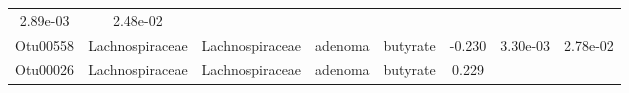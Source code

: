 \documentclass[11pt,]{article}
\begin{document}
\begin{longtable}[]{@{}cccccccc@{}}
\begin{minipage}[t]{0.08\columnwidth}
2.89e-03\strut
\end{minipage} & \begin{minipage}[t]{0.08\columnwidth}\centering\strut
2.48e-02\strut
\end{minipage}\tabularnewline
\begin{minipage}[t]{0.08\columnwidth}\centering\strut
Otu00558\strut
\end{minipage} & \begin{minipage}[t]{0.15\columnwidth}\centering\strut
Lachnospiraceae\strut
\end{minipage} & \begin{minipage}[t]{0.15\columnwidth}\centering\strut
Lachnospiraceae\strut
\end{minipage} & \begin{minipage}[t]{0.08\columnwidth}\centering\strut
adenoma\strut
\end{minipage} & \begin{minipage}[t]{0.09\columnwidth}\centering\strut
butyrate\strut
\end{minipage} & \begin{minipage}[t]{0.07\columnwidth}\centering\strut
-0.230\strut
\end{minipage} & \begin{minipage}[t]{0.08\columnwidth}\centering\strut
3.30e-03\strut
\end{minipage} & \begin{minipage}[t]{0.08\columnwidth}\centering\strut
2.78e-02\strut
\end{minipage}\tabularnewline
\begin{minipage}[t]{0.08\columnwidth}\centering\strut
Otu00026\strut
\end{minipage} & \begin{minipage}[t]{0.15\columnwidth}\centering\strut
Lachnospiraceae\strut
\end{minipage} & \begin{minipage}[t]{0.15\columnwidth}\centering\strut
Lachnospiraceae\strut
\end{minipage} & \begin{minipage}[t]{0.08\columnwidth}\centering\strut
adenoma\strut
\end{minipage} & \begin{minipage}[t]{0.09\columnwidth}\centering\strut
butyrate\strut
\end{minipage} & \begin{minipage}[t]{0.07\columnwidth}\centering\strut
0.229\strut
\end{minipage} & \begin{minipage}[t]{0.08\columnwidth}\centering\strut

\end{minipage}
\end{longtable}
\end{document}
